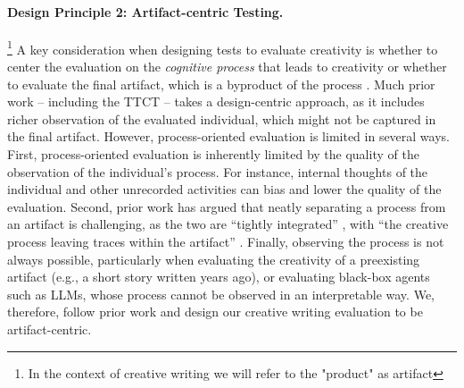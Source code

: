 \paragraph{Design Principle 2: Artifact-centric Testing.}\footnote{In the context of creative writing we will refer to the "product" as artifact}  A key consideration when designing tests to evaluate creativity is whether to center the evaluation on the \textit{cognitive process} that leads to creativity or whether to evaluate the final artifact, which is a byproduct of the process \cite{mayers2007re}.
Much prior work -- including the TTCT -- takes a design-centric approach, as it includes richer observation of the evaluated individual, which might not be captured in the final artifact. However, process-oriented evaluation is limited in several ways. First, process-oriented evaluation is inherently limited by the quality of the observation of the individual's process. For instance, internal thoughts of the individual and other unrecorded activities can bias and lower the quality of the evaluation. Second, prior work has argued that neatly separating a process from an artifact is challenging, as the two are ``tightly integrated'' \cite{mayers2007re}, with ``the creative process leaving traces within the artifact'' \cite{murray2012craft}. Finally, observing the process is not always possible, particularly when evaluating the creativity of a preexisting artifact (e.g., a short story written years ago), or evaluating black-box agents such as LLMs, whose process cannot be observed in an interpretable way. We, therefore, follow prior work \citet{vaezi2019development,rodriguez2008problem} and design our creative writing evaluation to be artifact-centric.

